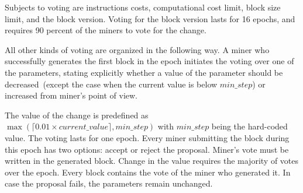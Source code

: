 Subjects to voting are instructions costs, computational cost limit, block size limit,
and the block version. Voting for the block version lasts for 16 epochs, and requires
90 percent of the miners to vote for the change.

All other kinds of voting are organized in the following way. A miner who
successfully generates the first block in the epoch initiates the voting over one
of the parameters, stating explicitly whether a value of the parameter should be
decreased~(except the case when the current value is below $min\_step$) or increased from miner's
point of view.

The value of the change is predefined as $\max(\lceil0.01 \times current\_value\rceil, min\_step)$ with $min\_step$
being the hard-coded value. The voting lasts for one epoch. Every miner
submitting the block during this epoch has two options: accept or reject the
proposal. Miner's vote must be written in the generated block. Change in the
value requires the majority of votes over the epoch. Every block contains the
vote of the miner who generated it. In case the proposal fails, the parameters
remain unchanged.


